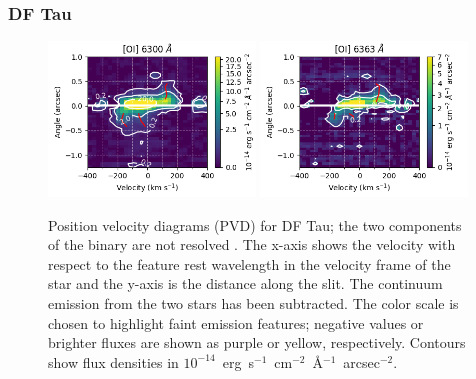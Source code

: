 \documentclass[twocolumn,trackchanges]{aastex63}
\begin{document}
\subsubsection{DF Tau}
\begin{figure}
\begin{center}
\includegraphics[width=0.49\textwidth]{DF_6300.png}
\includegraphics[width=0.49\textwidth]{DF_6363.png}
\caption{Position velocity diagrams (PVD) for DF Tau; the two components of the binary are not resolved . The x-axis
shows the velocity with respect to the feature rest wavelength in the
velocity frame of the star and the y-axis is the distance along the slit. The
continuum emission from the two stars has been subtracted. The color scale is
chosen to highlight faint emission features; negative values or brighter fluxes
are shown as purple or yellow, respectively.  Contours show flux densities in $10^{-14}$~erg~s$^{-1}$~cm$^{-2}$~\AA{}$^{-1}$~arcsec$^{-2}$.
\label{fig:DFTau}}
\end{center}
\end{figure}
\end{document}

